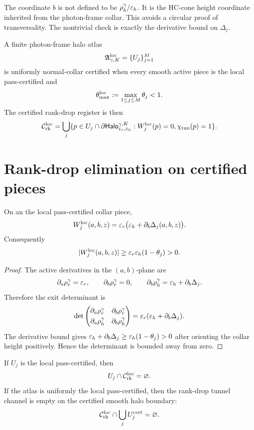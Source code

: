 \begin{remark}
The coordinate \(b\) is not defined to be \(\rho_{h}^{\gamma}/\varepsilon_h\). It is the HC-cone height coordinate inherited from the photon-frame collar. This avoids a circular proof of transversality. The nontrivial check is exactly the derivative bound on \(\Delta_j\).
\end{remark}

\begin{definition}
A finite photon-frame halo atlas
\[
\mathfrak A_{\gamma,K}^{\mathrm{loc}}=\{U_j\}_{j=1}^M
\]
is uniformly normal-collar certified when every smooth active piece is the local pass-certified and
\[
\theta_{\max}^{\mathrm{loc}}:=\max_{1\le j\le M}\theta_j<1.
\]
The certified rank-drop register is then
\[
\mathcal C_{\mathrm{rk}}^{\mathrm{loc}}=
\bigcup_j
\{p\in U_j\cap\partial\mathsf{Halo}_{\varepsilon_r,\varepsilon_h}^{\gamma,K}: W_j^{\mathrm{loc}}(p)=0,
\chi_{\mathrm{tun}}(p)=1\}.
\]
\end{definition}

\section{Rank-drop elimination on certified pieces}

\begin{lemma}
On an the local pass-certified collar piece,
\[
W_j^{\mathrm{loc}}(a,b,z)=\varepsilon_r\bigl(\varepsilon_h+\partial_b\Delta_j(a,b,z)\bigr).
\]
Consequently
\[
|W_j^{\mathrm{loc}}(a,b,z)|
\ge \varepsilon_r\varepsilon_h(1-\theta_j)>0.
\]
\end{lemma}

\begin{proof}
The active derivatives in the \((a,b)\)-plane are
\[
\partial_a\rho_{r}^{\gamma}=\varepsilon_r,
\qquad
\partial_b\rho_{r}^{\gamma}=0,
\qquad
\partial_b\rho_{h}^{\gamma}=\varepsilon_h+\partial_b\Delta_j.
\]
Therefore the exit determinant is
\[
\det
\begin{pmatrix}
\partial_a\rho_{r}^{\gamma}&\partial_b\rho_{r}^{\gamma}\\[1mm]
\partial_a\rho_{h}^{\gamma}&\partial_b\rho_{h}^{\gamma}
\end{pmatrix}
=\varepsilon_r(\varepsilon_h+\partial_b\Delta_j).
\]
The derivative bound gives \(\varepsilon_h+\partial_b\Delta_j\ge \varepsilon_h(1-\theta_j)>0\) after orienting the collar height positively. Hence the determinant is bounded away from zero.
\end{proof}

\begin{proposition}
If \(U_j\) is the local pass-certified, then
\[
U_j\cap\mathcal C_{\mathrm{rk}}^{\mathrm{loc}}=\varnothing .
\]
If the atlas is uniformly the local pass-certified, then the rank-drop tunnel channel is empty on the certified smooth halo boundary:
\[
\mathcal C_{\mathrm{rk}}^{\mathrm{loc}}\cap\bigcup_j U_j^{\mathrm{cert}}=\varnothing .
\]
\end{proposition}


